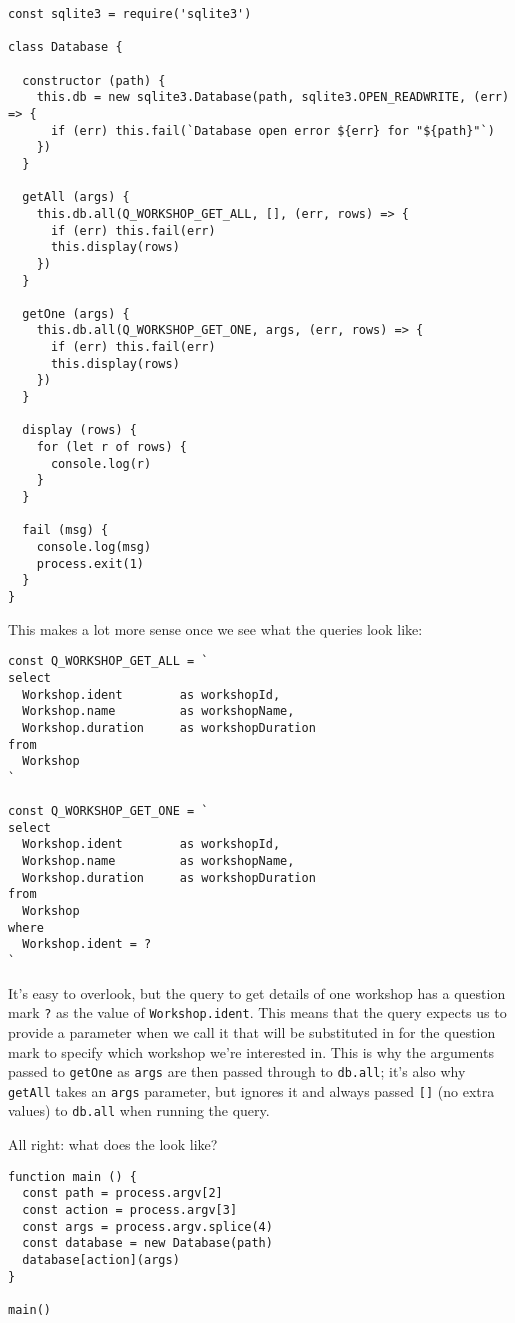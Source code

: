 \begin{verbatim}
const sqlite3 = require('sqlite3')

class Database {

  constructor (path) {
    this.db = new sqlite3.Database(path, sqlite3.OPEN_READWRITE, (err) => {
      if (err) this.fail(`Database open error ${err} for "${path}"`)
    })
  }

  getAll (args) {
    this.db.all(Q_WORKSHOP_GET_ALL, [], (err, rows) => {
      if (err) this.fail(err)
      this.display(rows)
    })
  }

  getOne (args) {
    this.db.all(Q_WORKSHOP_GET_ONE, args, (err, rows) => {
      if (err) this.fail(err)
      this.display(rows)
    })
  }

  display (rows) {
    for (let r of rows) {
      console.log(r)
    }
  }

  fail (msg) {
    console.log(msg)
    process.exit(1)
  }
}
\end{verbatim}

This makes a lot more sense once we see what the queries look like:

\begin{verbatim}
const Q_WORKSHOP_GET_ALL = `
select
  Workshop.ident        as workshopId,
  Workshop.name         as workshopName,
  Workshop.duration     as workshopDuration
from
  Workshop
`

const Q_WORKSHOP_GET_ONE = `
select
  Workshop.ident        as workshopId,
  Workshop.name         as workshopName,
  Workshop.duration     as workshopDuration
from
  Workshop
where
  Workshop.ident = ?
`
\end{verbatim}

It's easy to overlook,
but the query to get details of one workshop has a question mark \texttt{?} as the value of \texttt{Workshop.ident}.
This means that the query expects us to provide a parameter when we call it
that will be substituted in for the question mark
to specify which workshop we're interested in.
This is why the arguments passed to \texttt{getOne} as \texttt{args}
are then passed through to \texttt{db.all};
it's also why \texttt{getAll} takes an \texttt{args} parameter,
but ignores it and always passed \texttt{{[}{]}} (no extra values) to \texttt{db.all} when running the query.

All right:
what does the  look like?

\begin{verbatim}
function main () {
  const path = process.argv[2]
  const action = process.argv[3]
  const args = process.argv.splice(4)
  const database = new Database(path)
  database[action](args)
}

main()
\end{verbatim}


